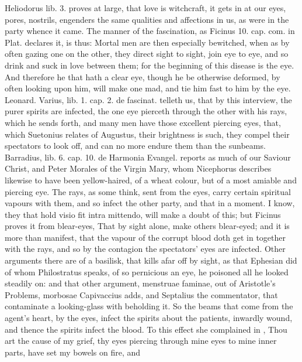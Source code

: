 Heliodorus lib. 3. proves at large, that love is witchcraft, it
gets in at our eyes, pores, nostrils, engenders the same qualities and
affections in us, as were in the party whence it came. The manner of
the fascination, as Ficinus 10. cap. com. in Plat. declares it, is
thus: Mortal men are then especially bewitched, when as by often gazing
one on the other, they direct sight to sight, join eye to eye, and so
drink and suck in love between them; for the beginning of this disease
is the eye. And therefore he that hath a clear eye, though he be
otherwise deformed, by often looking upon him, will make one mad, and
tie him fast to him by the eye. Leonard. Varius, lib. 1. cap. 2. de
fascinat. telleth us, that by this interview, the purer spirits
are infected, the one eye pierceth through the other with his rays,
which he sends forth, and many men have those excellent piercing eyes,
that, which Suetonius relates of Augustus, their brightness is such,
they compel their spectators to look off, and can no more endure them
than the sunbeams. Barradius, lib. 6. cap. 10. de Harmonia
Evangel. reports as much of our Saviour Christ, and Peter Morales
of the Virgin Mary, whom Nicephorus describes likewise to have been
yellow-haired, of a wheat colour, but of a most amiable and piercing
eye. The rays, as some think, sent from the eyes, carry certain
spiritual vapours with them, and so infect the other party, and that in
a moment. I know, they that hold visio fit intra mittendo, will make a
doubt of this; but Ficinus proves it from blear-eyes,  That by
sight alone, make others blear-eyed; and it is more than manifest, that
the vapour of the corrupt blood doth get in together with the rays, and
so by the contagion the spectators' eyes are infected. Other arguments
there are of a basilisk, that kills afar off by sight, as that Ephesian
did of whom Philostratus speaks, of so pernicious an eye, he
poisoned all he looked steadily on: and that other argument, menstruae
faminae, out of Aristotle's Problems, morbosae Capivaccius adds, and
Septalius the commentator, that contaminate a looking-glass with
beholding it.  So the beams that come from the agent's heart, by
the eyes, infect the spirits about the patients, inwardly wound, and
thence the spirits infect the blood. To this effect she complained in
\Apuleius, Thou art the cause of my grief, thy eyes piercing
through mine eyes to mine inner parts, have set my bowels on fire, and
